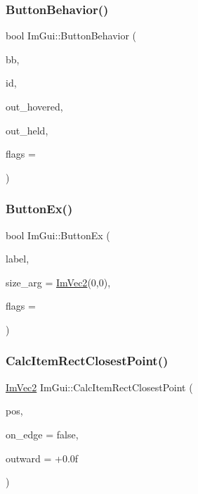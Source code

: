 \subsubsection{\texorpdfstring{Button\+Behavior()}{ButtonBehavior()}}
{\footnotesize\ttfamily bool Im\+Gui\+::\+Button\+Behavior (\begin{DoxyParamCaption}\item[{const \hyperlink{struct_im_rect}{Im\+Rect} \&}]{bb,  }\item[{Im\+Gui\+ID}]{id,  }\item[{bool $\ast$}]{out\+\_\+hovered,  }\item[{bool $\ast$}]{out\+\_\+held,  }\item[{Im\+Gui\+Button\+Flags}]{flags = {} }\end{DoxyParamCaption})}

\hypertarget{namespace_im_gui_ae479220c66b039874c6e4c9e9b22849f}{}\label{namespace_im_gui_ae479220c66b039874c6e4c9e9b22849f} 
\subsubsection{\texorpdfstring{Button\+Ex()}{ButtonEx()}}
{\footnotesize\ttfamily bool Im\+Gui\+::\+Button\+Ex (\begin{DoxyParamCaption}\item[{const char $\ast$}]{label,  }\item[{const \hyperlink{struct_im_vec2}{Im\+Vec2} \&}]{size\+\_\+arg = {\ttfamily \hyperlink{struct_im_vec2}{Im\+Vec2}(0,0)},  }\item[{Im\+Gui\+Button\+Flags}]{flags = {} }\end{DoxyParamCaption})}

\hypertarget{namespace_im_gui_a6c66a7acf7e6eef639b5f1211d8332a3}{}\label{namespace_im_gui_a6c66a7acf7e6eef639b5f1211d8332a3} 
\subsubsection{\texorpdfstring{Calc\+Item\+Rect\+Closest\+Point()}{CalcItemRectClosestPoint()}}
{\footnotesize\ttfamily \hyperlink{struct_im_vec2}{Im\+Vec2} Im\+Gui\+::\+Calc\+Item\+Rect\+Closest\+Point (\begin{DoxyParamCaption}\item[{const \hyperlink{struct_im_vec2}{Im\+Vec2} \&}]{pos,  }\item[{bool}]{on\+\_\+edge = {\ttfamily false},  }\item[{float}]{outward = {\ttfamily +0.0f} }\end{DoxyParamCaption})}

